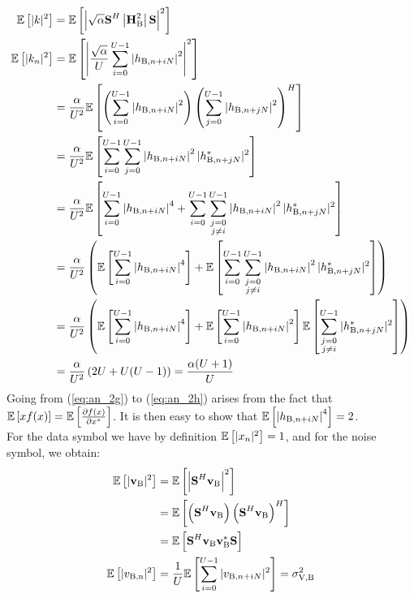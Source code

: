 \begin{subequations}
    \begin{align}
        \mathbb{E} \left[|k|^2\right] &= \mathbb{E} \left[\left|\sqrt{\alpha}\textbf{S}^H \left|\textbf{H}_{\text{B}}^2\right| \textbf{S}\right|^2\right] \\
        \mathbb{E} \left[|k_n|^2\right] &=\mathbb{E} \left[\left|\frac{\sqrt{\alpha}}{U}\sum_{i=0}^{U-1} \left| h_{\text{B}, n + iN}\right|^2\right|^2\right]  \\
        &= \frac{\alpha}{U^2} \mathbb{E} \left[\left(\sum_{i=0}^{U-1} \left| h_{\text{B}, n + iN}\right|^2\right) \left(\sum_{j=0}^{U-1} \left| h_{\text{B}, n + jN}\right|^2\right)^H\right] \label{subeq:appA:comp1}\\
        &= \frac{\alpha}{U^2}\mathbb{E} \left[\sum_{i=0}^{U-1}\sum_{j=0}^{U-1}\left| h_{\text{B}, n + iN}\right|^2 | h^*_{\text{B}, n + jN}|^2\right] \\
        &= \frac{\alpha}{U^2}\mathbb{E} \left[\sum_{i=0}^{U-1}\left| h_{\text{B}, n + iN}\right|^4 + \sum_{i=0}^{U-1}\sum_{\substack{j=0 \\ j\neq i}}^{U-1}\left| h_{\text{B}, n + iN}\right|^2 | h^*_{\text{B}, n + jN}|^2\right] \\
        &= \frac{\alpha}{U^2} \left(\mathbb{E} \left[\sum_{i=0}^{U-1}\left| h_{\text{B}, n + iN}\right|^4\right] + \mathbb{E} \left[\sum_{i=0}^{U-1}\sum_{\substack{j=0 \\ j\neq i}}^{U-1}\left| h_{\text{B}, n + iN}\right|^2 | h^*_{\text{B}, n + jN}|^2\right] \right) \\
        &=  \frac{\alpha}{U^2} \left(\mathbb{E} \left[\sum_{i=0}^{U-1}\left| h_{\text{B}, n + iN}\right|^4\right] + \mathbb{E} \left[\sum_{i=0}^{U-1}\left| h_{\text{B}, n + iN}\right|^2\right]\mathbb{E} \left[\sum_{\substack{j=0 \\ j\neq i}}^{U-1} | h^*_{\text{B}, n + jN}|^2\right] \right) \label{eq:an_2g}\\
        &= \frac{\alpha}{U^2} \left( 2U + U(U-1)\right) = \frac{\alpha (U+1)}{U} \label{eq:an_2h}
    \end{align}
    \label{eq:appA:data_bob}
\end{subequations}
Going from (\ref{eq:an_2g}) to (\ref{eq:an_2h}) arises from the fact that $\mathbb{E} \left[x f(x)\right] = \mathbb{E} \left[\frac{\partial f(x)}{\partial x^*}\right]$. It is then easy to show that $\mathbb{E} \left[\left| h_{\text{B}, n + iN}\right|^4\right]=2$. \\
For the data symbol we have by definition $\mathbb{E} \left[|x_n|^2\right]=1$, and for the noise symbol, we obtain:
\begin{subequations}
    \begin{align}
        \mathbb{E} \left[|\textbf{v}_{\text{B}}|^2\right] &=  \mathbb{E} \left[\left|\textbf{S}^H \textbf{v}_{\text{B}}\right|^2\right] \\
        &= \mathbb{E} \left[\left(\textbf{S}^H \textbf{v}_{\text{B}} \right)\left(\textbf{S}^H \textbf{v}_{\text{B}} \right)^H\right] \\
        &=\mathbb{E} \left[\textbf{S}^H \textbf{v}_{\text{B}} \textbf{v}_{\text{B}}^* \textbf{S} \right] \\
        \mathbb{E} \left[|v_{\text{B,n}}|^2\right] &= \frac{1}{U} \mathbb{E} \left[\sum_{i=0}^{U-1} |v_{\text{B}, n + iN}|^2\right] = \sigma^2_{\text{V,B}}
    \end{align}
    \label{eq:appA:noise_bob}
\end{subequations}

